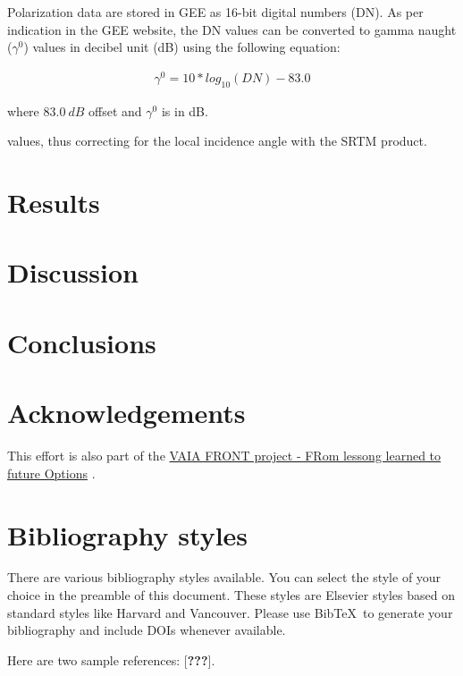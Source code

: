 \documentclass[]{elsarticle} %
\begin{document}
Polarization data are stored in GEE as 16-bit digital numbers (DN). As
per indication in the GEE website, the DN values can be converted to
gamma naught (\(\gamma^0\)) values in decibel unit (dB) using the
following equation:

\[
\begin{aligned}
 \gamma^0 = 10*log_{10}(DN) - 83.0  
\end{aligned}
\]

where \(83.0 \  dB\) offset and \(\gamma^0\) is in dB.

values, thus correcting for the local incidence angle with the SRTM
product.

\hypertarget{results}{%
\section{Results}\label{results}}

\hypertarget{discussion}{%
\section{Discussion}\label{discussion}}

\hypertarget{conclusions}{%
\section{Conclusions}\label{conclusions}}

\hypertarget{acknowledgements}{%
\section{Acknowledgements}\label{acknowledgements}}

This effort is also part of the
\href{https://www.tesaf.unipd.it/ricerca/progetti-dip-tesaf}{VAIA FRONT
project - FRom lessong learned to future Options} .

\hypertarget{bibliography-styles}{%
\section{Bibliography styles}\label{bibliography-styles}}

There are various bibliography styles available. You can select the
style of your choice in the preamble of this document. These styles are
Elsevier styles based on standard styles like Harvard and Vancouver.
Please use BibTeX~to generate your bibliography and include DOIs
whenever available.

Here are two sample references: {[}{\textbf{???}}{]}.
\end{document}

